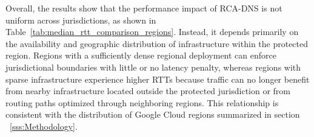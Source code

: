 \documentclass[acmsmall]{acmart}
\begin{document}

Overall, the results show that the performance impact of RCA-DNS is not uniform across jurisdictions, as shown in Table~\ref{tab:median_rtt_comparison_regions}. Instead, it depends primarily on the availability and geographic distribution of infrastructure within the protected region. Regions with a sufficiently dense regional deployment can enforce jurisdictional boundaries with little or no latency penalty, whereas regions with sparse infrastructure experience higher RTTs because traffic can no longer benefit from nearby infrastructure located outside the protected jurisdiction or from routing paths optimized through neighboring regions. This relationship is consistent with the distribution of Google Cloud regions summarized in section ~\ref{sss:Methodology}.
\end{document}
